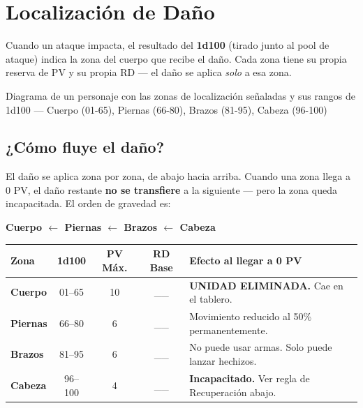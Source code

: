 \section{Localización de Daño}

Cuando un ataque impacta, el resultado del \textbf{1d100} (tirado junto al pool de ataque) indica la zona del cuerpo que recibe el daño. Cada zona tiene su propia reserva de PV y su propia RD — el daño se aplica \textit{solo} a esa zona.

\begin{imagebox}{Diagrama de un personaje con las zonas de localización señaladas y sus rangos de 1d100 — Cuerpo (01-65), Piernas (66-80), Brazos (81-95), Cabeza (96-100)}
    \vspace{3.5cm}
\end{imagebox}

\subsection*{¿Cómo fluye el daño?}

El daño se aplica zona por zona, de abajo hacia arriba. Cuando una zona llega a 0 PV, el daño restante \textbf{no se transfiere} a la siguiente — pero la zona queda incapacitada. El orden de gravedad es:

\begin{center}
\large \textbf{Cuerpo $\leftarrow$ Piernas $\leftarrow$ Brazos $\leftarrow$ Cabeza}
\end{center}

\vspace{0.2cm}

\begin{tabularx}{\linewidth}{|l|c|c|c|X|}
\hline
\rowcolor{HammerRed!20} \textbf{Zona} & \textbf{1d100} & \textbf{PV Máx.} & \textbf{RD Base} & \textbf{Efecto al llegar a 0 PV} \\ \hline
\textbf{Cuerpo} & 01--65 & 10 & \_\_ & \textbf{UNIDAD ELIMINADA.} Cae en el tablero. \\ \hline
\textbf{Piernas} & 66--80 & 6 & \_\_ & Movimiento reducido al 50\% permanentemente. \\ \hline
\textbf{Brazos} & 81--95 & 6 & \_\_ & No puede usar armas. Solo puede lanzar hechizos. \\ \hline
\textbf{Cabeza} & 96--100 & 4 & \_\_ & \textbf{Incapacitado.} Ver regla de Recuperación abajo. \\ \hline
\end{tabularx}

